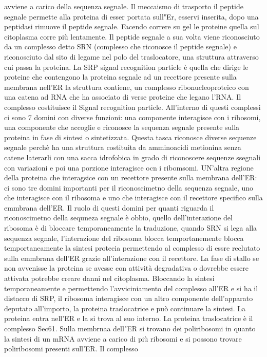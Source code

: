 avviene a carico della sequenza segnale. Il meccaismo di trasporto il peptide segnale permette alla proteina di esser portata sull"Er, esservi inserita, dopo una peptidasi rimuove il 
peptide segnale. Facendo correre su gel le proteine quella sul citoplasma corre pi\`u lentamente. Il peptide segnale a sua volta viene riconosciuto da un complesso detto SRN (complesso
che riconosce il peptide segnale) e riconosciuto dal sito di legame nel polo del traslocatore, una struttura attraverso cui passa la proteina. La SRP signal recognition particle \`e 
quella che dirige le proteine che contengono la proteina segnale ad un recettore presente sulla membrana nell'ER la struttura contiene, un complesso ribonucleoproteico con una catena 
ad RNA che ha associato di verse proteine che legano l'RNA. Il complesso costituisce il Signal recognition particle. All'interno di questi complessi ci sono 7 domini con diverse funzioni:
una componente interagisce con i ribosomi, una componente che accoglie e riconosce la sequenza segnale presente sulla proteina in fase di sintesi o sintetizzata. Questa tasca riconosce 
diverse sequenze segnale perch\`e ha una struttura costituita da amminoacidi metionina senza catene laterarli con una sacca idrofobica in grado di riconoscere sequenze ssegnali con 
variazioni e poi una porzione interagisce ocn i ribomsomi. UN'altra regione della proteina che interagsice con un recettore presente sulla membrana dell'ER: ci sono tre domini importanti
per il riconoscimetno della sequenza segnale, uno che interagisce con il ribosoma e uno che interagisce con il recettore specifico sulla emmbrana dell'ER. Il ruolo di questi domini per 
quanti riguarda il riconoscimetno della sequneza segnale \`e obbio, quello dell'interazione del ribosoma \`e di bloccare temporaneamente la traduzione, quando SRN si lega alla sequenza
segnale, l'interazione del ribosoma blocca temportanemente blocca temportaneamente la sintesi protecia permettendo al complesso di essre reclutato sulla emmbrana dell'ER grazie 
all'interazione con il recettore. La fase di stallo se non avvenisse la proteina se avesse con attivit\`a degradativa o dovrebbe essere attivata potrebbe creare danni nel citoplasma. 
Bloccando la sintesi temporaneamente e permettendo l'avviciniamento del complesso all'ER e si ha il distacco di SRP, il ribosoma interagisce con un altro componente dell'apparato 
deputato all'importo, la proteina traslocatrice e pu\`o continuare la sintesi. La proteina entra nell'ER e la si trova al suo interno. La proteina traslocatrice \`e il complesso Sec61. 
Sulla membrnaa dell"ER si trovano dei poliribosomi in quanto la sintesi di un mRNA avviene a carico di pi\`u ribosomi e si possono trovare poliribosomi presenti sull'ER. Il complesso 
